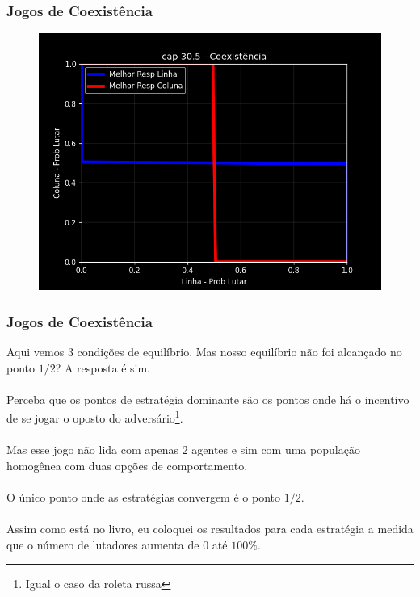 \documentclass{beamer}[10]
\begin{document}
\begin{frame}
	\frametitle{Jogos de Coexistência}

	\begin{figure}[H]
		\centering
		\includegraphics[scale=0.55]{cap30_5-coexistencia_1.png}
	\end{figure}
		
\end{frame}

\begin{frame}
	\frametitle{Jogos de Coexistência}

	Aqui vemos 3 condições de equilíbrio. Mas nosso equilíbrio não foi alcançado no ponto $1/2$? A resposta é sim. 
	\\~\\
	Perceba que os pontos de estratégia dominante são os pontos onde há o incentivo de se jogar o oposto do adversário\footnote{Igual o caso da roleta russa}. 
	\\~\\
	Mas esse jogo não lida com apenas 2 agentes e sim com uma população homogênea com duas opções de comportamento. 
	\\~\\
	O único ponto onde as estratégias convergem é o ponto $1/2$.
	\\~\\
	Assim como está no livro, eu coloquei os resultados para cada estratégia a medida que o número de lutadores aumenta de $0$ até $100\%$.

\end{frame}
\end{document}
